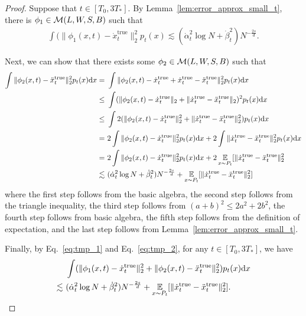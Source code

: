 \begin{proof}
    Suppose that $t \in [T_0, 3T_*]$.
    By Lemma~\ref{lem:error_approx_small_t}, there is $\phi_1 \in {\cal M}(L,W,S,B)$ such that
    \begin{align}
        \label{eq:tmp_1}
        \int (\|\phi_1(x, t) - \dot{x}_t^\mathrm{true}\|_2^2 p_t(x) \lesssim  (\dot{\alpha}_t^2 \log N + \dot{\beta}_t^2 ) N^{- \frac{2s}{d}}.
    \end{align}
    
    Next, we can show that there exists some $\phi_2 \in {\cal M}(L,W,S,B)$ such that
    \begin{align}
         \int \|\phi_2(x, t) - \ddot{x}_t^\mathrm{true}\|_2^2 p_t(x) \mathrm{d} x 
         = &~\int \|\phi_2(x, t) - \dot{x}_t^\mathrm{true} +\dot{x}_t^\mathrm{true} - \ddot{x}_t^\mathrm{true}\|_2^2 p_t(x) \mathrm{d} x \notag \\
         \leq &~ \int (\|\phi_2(x, t) - \dot{x}_t^\mathrm{true}\|_2 + \| \dot{x}_t^\mathrm{true}-\ddot{x}_t^\mathrm{true}\|_2)^2 p_t(x) \mathrm{d} x \notag \\
         \leq &~ \int 2(\|\phi_2(x, t) - \dot{x}_t^\mathrm{true}\|_2^2 + \| \dot{x}_t^\mathrm{true}-\ddot{x}_t^\mathrm{true}\|_2^2) p_t(x) \mathrm{d} x \notag \\
         = &~ 2\int \|\phi_2(x, t) - \dot{x}_t^\mathrm{true}\|_2^2 p_t(x) \mathrm{d} x + 2\int \| \dot{x}_t^\mathrm{true}-\ddot{x}_t^\mathrm{true}\|_2^2 p_t(x) \mathrm{d} x \notag \\
         = &~ 2\int \|\phi_2(x, t) - \dot{x}_t^\mathrm{true}\|_2^2p_t(x)\mathrm{d} x + 2\operatorname*{{\mathbb{E}}}_{x \sim P_t}[\|\dot{x}^\mathrm{true}_t - \ddot{x}^\mathrm{true}_t\|_2^2 \notag \\
         \lesssim &~ (\dot{\alpha}_t^2 \log N + \dot{\beta}_t^2 ) N^{- \frac{2s}{d}} + \operatorname*{{\mathbb{E}}}_{x \sim P_t}[\|\dot{x}^\mathrm{true}_t - \ddot{x}^\mathrm{true}_t\|_2^2] \label{eq:tmp_2}
    \end{align}
    where the first step follows from the basic algebra, the second step follows from the triangle inequality, the third step follows from $(a+b)^2 \leq 2a^2 + 2b^2$, the fourth step follows from basic algebra, the fifth step follows from the definition of expectation, and the last step follows from Lemma~\ref{lem:error_approx_small_t}.

    Finally, by Eq.~\eqref{eq:tmp_1} and Eq.~\eqref{eq:tmp_2}, for any $t \in [T_0, 3T_*]$, we have
    \begin{align*}
    &~ \int (\|\phi_1(x, t) - \dot{x}_t^\mathrm{true}\|_2^2 + \|\phi_2(x, t) - \ddot{x}_t^\mathrm{true}\|_2^2) p_t(x) \mathrm{d} x \\ \lesssim &~ (\dot{\alpha}_t^2 \log N + \dot{\beta}_t^2 ) N^{- \frac{2s}{d}} +
    \operatorname*{{\mathbb{E}}}_{x \sim P_t}[\|\dot{x}^\mathrm{true}_t - \ddot{x}^\mathrm{true}_t\|_2^2].
    \end{align*}


\end{proof}
